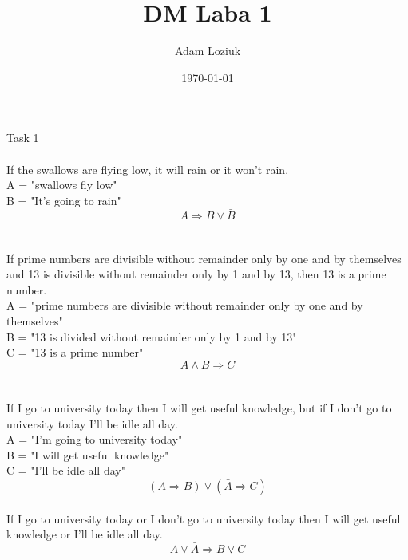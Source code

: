 \documentclass{article}
\title{DM Laba 1}
\author{Adam Loziuk}
\date{\today}
\begin{document}
\maketitle

Task 1 \\ \\
If the swallows are flying low, it will rain or it won't rain. \\
A = "swallows fly low" \\
B = "It's going to rain" \\
$$ A \Rightarrow B \vee \bar B $$ \\
\\
If prime numbers are divisible without remainder only by one and by themselves and 13 is divisible without remainder only by 1 and by 13, then 13 is a prime number. \\
A = "prime numbers are divisible without remainder only by one and by themselves" \\
B = "13 is divided without remainder only by 1 and by 13" \\
C = "13 is a prime number" \\
$$ A \wedge B \Rightarrow C $$ \\
\\
If I go to university today then I will get useful knowledge, but if I don't go to university today I'll be idle all day. \\
A = "I'm going to university today" \\
B = "I will get useful knowledge" \\
C = "I'll be idle all day" \\
$$ (A \Rightarrow B) \vee (\bar A \Rightarrow C) $$ \\
If I go to university today or I don't go to university today then I will get useful knowledge or I'll be idle all day. \\
$$ A \vee \bar A \Rightarrow B \vee C $$ \\ \\
\end{document}
